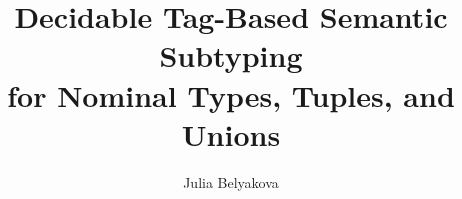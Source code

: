\documentclass[sigplan]{acmart}\settopmatter{}
\begin{document}
\title[Tag-Based Semantic Subtyping]{Decidable Tag-Based Semantic Subtyping \\
	for Nominal Types, Tuples, and Unions}



\author{Julia Belyakova}
\end{document}
